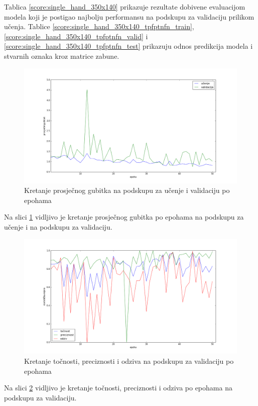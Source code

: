 \documentclass[times, utf8, diplomski, numeric]{fer}
\begin{document}
\noindent Tablica \ref{score:single_hand_350x140} prikazuje rezultate dobivene evaluacijom modela koji je postigao najbolju performansu na podskupu za validaciju prilikom učenja.
Tablice \ref{score:single_hand_350x140_tpfptnfn_train}, \ref{score:single_hand_350x140_tpfptnfn_valid} i \ref{score:single_hand_350x140_tpfptnfn_test} prikazuju odnos predikcija modela i stvarnih oznaka kroz matrice zabune.

\begin{figure}[H]
\centering
\includegraphics[scale=0.35]{images/single_hand_scale050_loss.png}
\caption{Kretanje prosječnog gubitka na podskupu za učenje i validaciju po epohama}
\label{img:single_hand_scale050_loss}
\end{figure}
\noindent Na slici \ref{img:single_hand_scale050_loss} vidljivo je kretanje prosječnog gubitka po epohama na podskupu za učenje i na podskupu za validaciju.

\begin{figure}[H]
\centering
\includegraphics[scale=0.35]{images/single_hand_scale050_acc_ap.png}
\caption{Kretanje točnosti, preciznosti i odziva na podskupu za validaciju po epohama}
\label{img:single_hand_scale050_acc_ap}
\end{figure}
\noindent Na slici \ref{img:single_hand_scale050_acc_ap} vidljivo je kretanje točnosti, preciznosti i odziva po epohama na podskupu za validaciju.
\end{document}
